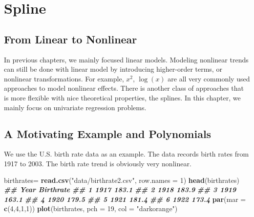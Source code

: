 \documentclass[
]{book}
\newenvironment{Shaded}{\begin{snugshade}}{\end{snugshade}}
\newcommand{\AttributeTok}[1]{\textcolor[rgb]{0.13,0.29,0.53}{#1}}
\newcommand{\DecValTok}[1]{\textcolor[rgb]{0.00,0.00,0.81}{#1}}
\newcommand{\DocumentationTok}[1]{\textcolor[rgb]{0.56,0.35,0.01}{\textbf{\textit{#1}}}}
\newcommand{\FunctionTok}[1]{\textcolor[rgb]{0.13,0.29,0.53}{\textbf{#1}}}
\newcommand{\NormalTok}[1]{#1}
\newcommand{\OtherTok}[1]{\textcolor[rgb]{0.56,0.35,0.01}{#1}}
\newcommand{\StringTok}[1]{\textcolor[rgb]{0.31,0.60,0.02}{#1}}
\theoremstyle{definition}
\theoremstyle{definition}
\theoremstyle{definition}
\theoremstyle{definition}
\theoremstyle{remark}
\begin{document}
\hypertarget{spline}{%
\chapter{Spline}\label{spline}}

\hypertarget{from-linear-to-nonlinear}{%
\section{From Linear to Nonlinear}\label{from-linear-to-nonlinear}}

In previous chapters, we mainly focused linear models. Modeling nonlinear trends can still be done with linear model by introducing higher-order terms, or nonlinear transformations. For example, \(x^2\), \(\log(x)\) are all very commonly used approaches to model nonlinear effects. There is another class of approaches that is more flexible with nice theoretical properties, the splines. In this chapter, we mainly focus on univariate regression problems.

\hypertarget{a-motivating-example-and-polynomials}{%
\section{A Motivating Example and Polynomials}\label{a-motivating-example-and-polynomials}}

We use the U.S. birth rate data as an example. The data records birth rates from 1917 to 2003. The birth rate trend is obviously very nonlinear.

\begin{Shaded}
\begin{Highlighting}[]
\NormalTok{    birthrates}\OtherTok{=} \FunctionTok{read.csv}\NormalTok{(}\StringTok{"data/birthrate2.csv"}\NormalTok{, }\AttributeTok{row.names =} \DecValTok{1}\NormalTok{)}
    \FunctionTok{head}\NormalTok{(birthrates)}
\DocumentationTok{\#\#   Year Birthrate}
\DocumentationTok{\#\# 1 1917     183.1}
\DocumentationTok{\#\# 2 1918     183.9}
\DocumentationTok{\#\# 3 1919     163.1}
\DocumentationTok{\#\# 4 1920     179.5}
\DocumentationTok{\#\# 5 1921     181.4}
\DocumentationTok{\#\# 6 1922     173.4}
    \FunctionTok{par}\NormalTok{(}\AttributeTok{mar =} \FunctionTok{c}\NormalTok{(}\DecValTok{4}\NormalTok{,}\DecValTok{4}\NormalTok{,}\DecValTok{1}\NormalTok{,}\DecValTok{1}\NormalTok{))}
    \FunctionTok{plot}\NormalTok{(birthrates, }\AttributeTok{pch =} \DecValTok{19}\NormalTok{, }\AttributeTok{col =} \StringTok{"darkorange"}\NormalTok{)}
\end{Highlighting}
\end{Shaded}
\end{document}
